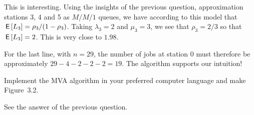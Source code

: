 \begin{exercise}
\begin{solution}
\begin{pyconsole}
\end{pyconsole}

This is interesting. Using the insights of the previous question,
approximation stations 3, 4 and 5 as $M/M/1$ queues, we have according
to this model that $\,\mathsf{E}\left[ L_3\right] = \rho_3/(1-\rho_3)$. Taking
$\lambda_3 = 2$ and $\mu_3 = 3$, we see that $\rho_3 = 2/3$ so that
$\,\mathsf{E}\left[ L_3\right] = 2$. This is very close to $1.98$. 

For the last line, with $n=29$, the number of jobs at station 0 must
therefore be approximately $29-4-2-2-2 = 19$. The algorithm supports
our intuition!
\end{solution}
\end{exercise}

\begin{exercise}
 Implement the MVA algorithm in your preferred computer language and make Figure~3.2.
\begin{solution}
 See the answer of the previous question.
\end{solution}
\end{exercise}







